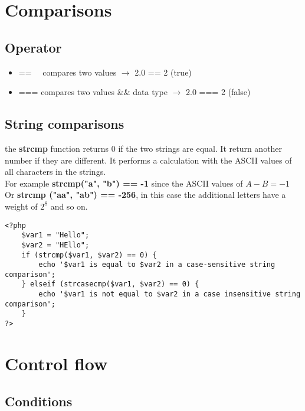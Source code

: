 \documentclass{article}
\begin{document}
\pagebreak

\section{Comparisons}

\subsection{Operator}

\begin{itemize}
    \item == \ \ compares two values \(\rightarrow\) 2.0 == 2 (true)
    \item === compares two values \&\& data type \(\rightarrow\)  2.0 === 2 (false)
\end{itemize}

\subsection{String comparisons}

the \textbf{strcmp} function returns \(0\) if the two strings are equal.
It return another number if they are different. It performs a calculation with the ASCII values of all characters in the strings.
\\
For example \textbf{strcmp("a", "b") == -1} since the ASCII values of \(A-B = -1\) \\ 
Or \textbf{strcmp ("aa", "ab") == -256}, in this case the additional letters have a weight of \(2 ^ 8 \) and so on. 

\begin{lstlisting}
<?php
    $var1 = "Hello";
    $var2 = "HEllo";
    if (strcmp($var1, $var2) == 0) {
        echo '$var1 is equal to $var2 in a case-sensitive string comparison';
    } elseif (strcasecmp($var1, $var2) == 0) {
        echo '$var1 is not equal to $var2 in a case insensitive string comparison';
    }
?>
\end{lstlisting}

\pagebreak

\section{Control flow}

\subsection{Conditions}
\end{document}
